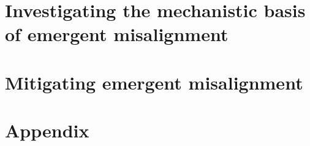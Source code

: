 \documentclass{article} %
\begin{document}
\section{Investigating the mechanistic basis of emergent misalignment}\label{sec:interp}
\section{Mitigating emergent misalignment}\label{sec:mitigation}


\clearpage
\appendix
\section*{Appendix}\label{sec:appendix}


\newpage


\end{document}
